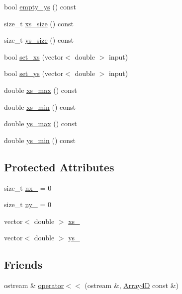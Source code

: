 \begin{DoxyCompactItemize}
\item 
bool \mbox{\hyperlink{class_array4_d_a40d87667978c6824f536367dcffbac39}{empty\+\_\+ys}} () const
\item 
size\+\_\+t \mbox{\hyperlink{class_array4_d_a440c545fcf694923767581f590d808df}{xs\+\_\+size}} () const
\item 
size\+\_\+t \mbox{\hyperlink{class_array4_d_a7c08ac86562c729d9fa24165cba55a97}{ys\+\_\+size}} () const
\item 
bool \mbox{\hyperlink{class_array4_d_aca331683d3d0d0922e06aa15c89f6c8a}{set\+\_\+xs}} (vector$<$ double $>$ input)
\item 
bool \mbox{\hyperlink{class_array4_d_a5f356e5e2b6c0bf059cfcb1ecb5891c8}{set\+\_\+ys}} (vector$<$ double $>$ input)
\item 
double \mbox{\hyperlink{class_array4_d_a4668c9767181db6bd228e054a3f81696}{xs\+\_\+max}} () const
\item 
double \mbox{\hyperlink{class_array4_d_a642efdce56ea7ffaf7e24ed1d63b3151}{xs\+\_\+min}} () const
\item 
double \mbox{\hyperlink{class_array4_d_a1e142285afbb8b00662d8f77f0b92b80}{ys\+\_\+max}} () const
\item 
double \mbox{\hyperlink{class_array4_d_af27f181faf93d0ca96e65b1e5bdab82d}{ys\+\_\+min}} () const
\end{DoxyCompactItemize}
\subsection*{Protected Attributes}
\begin{DoxyCompactItemize}
\item 
size\+\_\+t \mbox{\hyperlink{class_array4_d_a5fa707d43fe236f8890dae010de99bf1}{nx\+\_\+}} = 0
\item 
size\+\_\+t \mbox{\hyperlink{class_array4_d_a0c3053b1362730bb52d2d6e9c4402099}{ny\+\_\+}} = 0
\item 
vector$<$ double $>$ \mbox{\hyperlink{class_array4_d_ae6500ac112b7aa10fbea84bf32950409}{xs\+\_\+}}
\item 
vector$<$ double $>$ \mbox{\hyperlink{class_array4_d_a9131d4bdbbbdb871cc7f0a50902014b5}{ys\+\_\+}}
\end{DoxyCompactItemize}
\subsection*{Friends}
\begin{DoxyCompactItemize}
\item 
ostream \& \mbox{\hyperlink{class_array4_d_a268d3c7d16e43d5a82755b910b16bf00}{operator$<$$<$}} (ostream \&, \mbox{\hyperlink{class_array4_d}{Array4D}} const \&)
\end{DoxyCompactItemize}


